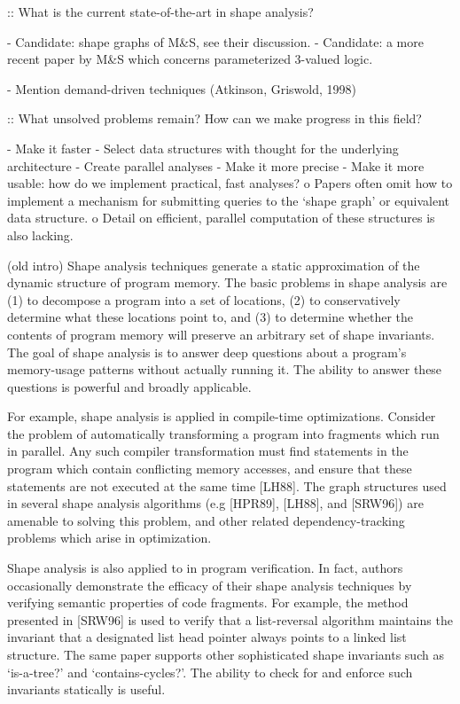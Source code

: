 \documentclass{article}
\begin{document}
:: What is the current state-of-the-art in shape analysis?

- Candidate: shape graphs of M\&S, see their discussion.
- Candidate: a more recent paper by M\&S which concerns parameterized 3-valued
  logic.

- Mention demand-driven techniques (Atkinson, Griswold, 1998)

:: What unsolved problems remain? How can we make progress in this field?

- Make it faster
    - Select data structures with thought for the underlying architecture
    - Create parallel analyses
- Make it more precise
- Make it more usable: how do we implement practical, fast analyses?
	o Papers often omit how to implement a mechanism for submitting queries
	  to the `shape graph' or equivalent data structure.  
	o Detail on efficient, parallel computation of these structures is also
	  lacking.

      (old intro)
Shape analysis techniques generate a static approximation of the dynamic
structure of program memory. The basic problems in shape analysis are (1) to
decompose a program into a set of locations, (2) to conservatively determine
what these locations point to, and (3) to determine whether the contents of
program memory will preserve an arbitrary set of shape invariants. The goal
of shape analysis is to answer deep questions about a program's memory-usage
patterns without actually running it. The ability to answer these questions
is powerful and broadly applicable.

For example, shape analysis is applied in compile-time optimizations.
Consider the problem of automatically transforming a program into fragments
which run in parallel. Any such compiler transformation must find
statements in the program which contain conflicting memory accesses, and
ensure that these statements are not executed at the same time [LH88]. The
graph structures used in several shape analysis algorithms (e.g [HPR89],
[LH88], and [SRW96]) are amenable to solving this problem, and other related
dependency-tracking problems which arise in optimization.

Shape analysis is also applied to in program verification. In fact, authors
occasionally demonstrate the efficacy of their shape analysis techniques by
verifying semantic properties of code fragments. For example, the method
presented in [SRW96] is used to verify that a list-reversal algorithm
maintains the invariant that a designated list head pointer always points to
a linked list structure. The same paper supports other sophisticated shape
invariants such as `is-a-tree?' and `contains-cycles?'. The ability to
check for and enforce such invariants statically is useful.
\end{document}
